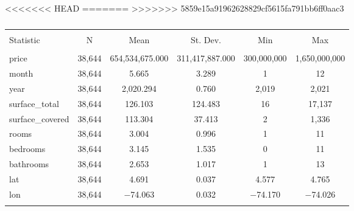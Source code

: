 
<<<<<<< HEAD
=======
>>>>>>> 5859e15a91962628829cf5615fa791bb6ff0aac3
\begin{table}[!htbp] \centering 
  \caption{} 
  \label{} 
\begin{tabular}{@{\extracolsep{5pt}}lccccc} 
\\[-1.8ex]\hline 
\hline \\[-1.8ex] 
Statistic & \multicolumn{1}{c}{N} & \multicolumn{1}{c}{Mean} & \multicolumn{1}{c}{St. Dev.} & \multicolumn{1}{c}{Min} & \multicolumn{1}{c}{Max} \\ 
\hline \\[-1.8ex] 
price & 38,644 & 654,534,675.000 & 311,417,887.000 & 300,000,000 & 1,650,000,000 \\ 
month & 38,644 & 5.665 & 3.289 & 1 & 12 \\ 
year & 38,644 & 2,020.294 & 0.760 & 2,019 & 2,021 \\ 
surface\_total & 38,644 & 126.103 & 124.483 & 16 & 17,137 \\ 
surface\_covered & 38,644 & 113.304 & 37.413 & 2 & 1,336 \\ 
rooms & 38,644 & 3.004 & 0.996 & 1 & 11 \\ 
bedrooms & 38,644 & 3.145 & 1.535 & 0 & 11 \\ 
bathrooms & 38,644 & 2.653 & 1.017 & 1 & 13 \\ 
lat & 38,644 & 4.691 & 0.037 & 4.577 & 4.765 \\ 
lon & 38,644 & $-$74.063 & 0.032 & $-$74.170 & $-$74.026 \\ 
\hline \\[-1.8ex] 
\end{tabular} 
\end{table} 
